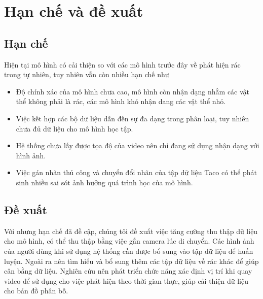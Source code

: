 \documentclass[../the.tex]{subfiles}
\begin{document}
\section{Hạn chế và đề xuất}
\subsection{Hạn chế}
{\fontsize{13}{12} \selectfont
Hiện tại mô hình có cải thiện so với các mô hình trước đây về phát hiện rác trong tự nhiên, tuy nhiên vẫn còn nhiều hạn chế như
\begin{itemize}
    \item Độ chính xác của mô hình chưa cao, mô hình còn nhận dạng nhằm các vật thể không phải là rác, các mô hình khó nhận dang các vật thể nhỏ.
    \item Việc kết hợp các bộ dữ liệu dẫn đến sự đa dạng trong phân loại, tuy nhiên chưa đủ dữ liệu cho mô hình học tập.
    \item Hệ thống chưa lấy được tọa độ của video nên chỉ đang sử dụng nhận dạng với hình ảnh.
    \item Việc gán nhãn thủ công và chuyển đổi nhãn của tập dữ liệu Taco có thể phát sinh nhiều sai sót ảnh hưởng quá trình học của mô hình.	
\end{itemize}
}
\subsection{Đề xuất}
{\fontsize{13}{12} \selectfont 
Với nhưng hạn chế đã đề cập, chúng tôi đề xuất việc tăng cường thu thập dữ liệu cho mô hình, có thể thu thập bằng việc gắn camera lúc di chuyển.
Các hình ảnh của người dùng khi sử dụng hệ thống cần được bổ sung vào tập dữ liệu để huấn luyện.
Ngoài ra nên tìm hiểu và bổ sung thêm các tập dữ liệu về rác khác để giúp cân bằng dữ liệu.
Nghiên cứu nên phát triển chức năng xác định vị trí khi quay video để sử dụng cho việc phát hiện theo thời gian thực, giúp cải thiện dữ liệu cho bản đồ phân bố.
}
\end{document}
